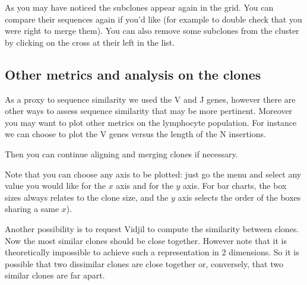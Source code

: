 \documentclass[11pt]{article}
\begin{document}
As you may have noticed the subclones appear again in the grid. You can
compare their sequences again if you'd like (for example to double check that
you were right to merge them). You can also remove some subclones from the
cluster by clicking on the cross at their left in the list.


\subsection{Other metrics and analysis on the clones}

As a proxy to sequence similarity we used the V and J genes, however there are
other ways to assess sequence similarity that may be more pertinent.
Moreover you may want to plot other metrics on the lymphocyte population.
%
For instance we can choose to plot the V genes versus the length of the N
insertions.

Then you can continue aligning and merging clones if necessary.


Note that you can choose any axis to be plotted: just go the  menu and
select any value you would like for the $x$ axis and for the $y$ axis.
For bar charts, the box sizes always relates to the clone size,
and the $y$ axis selects the order of the boxes sharing a same $x$).



Another possibility is to request Vidjil to compute the similarity between
clones.
Now the most similar clones should be close together. However note that it is
theoretically impossible to achieve such a representation in 2 dimensions. So
it is possible that two dissimilar clones are close together or, conversely,
that two similar clones are far apart.
\end{document}

